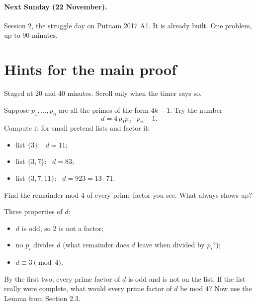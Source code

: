 \documentclass[11pt]{article}
\theoremstyle{plain}
\theoremstyle{definition}
\begin{document}
\paragraph{Next Sunday (22 November).} Session 2, the struggle day on Putnam 2017 A1. It is already built. One problem, up to 90 minutes.

\clearpage
\section*{Hints for the main proof}
Staged at 20 and 40 minutes. Scroll only when the timer says so.

\spoilerspace
\begin{hint}
Suppose $p_1, \dots, p_n$ are all the primes of the form $4k - 1$. Try the number
\[ d = 4\,p_1 p_2 \cdots p_n - 1. \]
Compute it for small pretend lists and factor it:
\begin{itemize}
  \item list $\{3\}$: \ $d = 11$;
  \item list $\{3, 7\}$: \ $d = 83$;
  \item list $\{3, 7, 11\}$: \ $d = 923 = 13 \cdot 71$.
\end{itemize}
Find the remainder mod $4$ of every prime factor you see. What always shows up?
\end{hint}

\spoilerspace
\begin{hint}
Three properties of $d$:
\begin{itemize}
  \item $d$ is odd, so $2$ is not a factor;
  \item no $p_i$ divides $d$ (what remainder does $d$ leave when divided by $p_i$?);
  \item $d \equiv 3 \pmod 4$.
\end{itemize}
By the first two, every prime factor of $d$ is odd and is not on the list. If the list really were complete, what would every prime factor of $d$ be mod $4$? Now use the Lemma from Section 2.3.
\end{hint}
\end{document}

